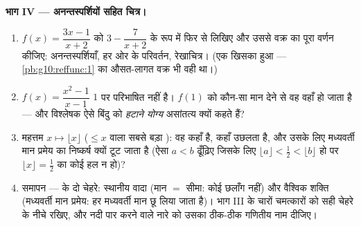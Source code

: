 \begin{problem}
\medskip
\noindent\textbf{भाग IV --- अनन्तस्पर्शियों सहित चित्र।}
\begin{enumerate}[resume]
  \item $f(x) = \dfrac{3x - 1}{x + 2}$ को $3 - \dfrac{7}{x + 2}$ के रूप में फिर से लिखिए और उससे वक्र का पूरा वर्णन
        कीजिए: अनन्तस्पर्शियाँ, हर ओर के परिवर्तन, रेखाचित्र। (एक खिसका हुआ
         --- \cref{pb:g10:reffunc:1} का औसत-लागत वक्र भी वही था।)
  \item {} $f(x) = \dfrac{x^2 - 1}{x - 1}$ $1$ पर परिभाषित नहीं है। $f(1)$ को कौन-सा मान देने से वह
        वहाँ  हो जाता है --- और विश्लेषक ऐसे बिंदु को \emph{हटाने योग्य}
        असांतत्य क्यों कहते हैं?
  \item महत्तम   $x \mapsto \lfloor x \rfloor$ ($\leq x$ वाला सबसे बड़ा ): वह कहाँ
         है, कहाँ उछलता है, और उसके लिए मध्यवर्ती मान प्रमेय का निष्कर्ष
        क्यों टूट जाता है (ऐसा $a < b$ ढूँढ़िए जिसके लिए $\lfloor a \rfloor < \frac12 < \lfloor b \rfloor$ हो पर $\lfloor x \rfloor = \frac12$ का
        कोई हल न हो)?
  \item समापन ---  के दो चेहरे: स्थानीय वादा (मान $=$ सीमा: कोई
        छलाँग नहीं) और वैश्विक शक्ति (मध्यवर्ती मान प्रमेय: हर मध्यवर्ती मान
        छू लिया जाता है)। भाग III के चारों चमत्कारों को सही चेहरे के नीचे
        रखिए, और नदी पार करने वाले नारे को उसका ठीक-ठीक गणितीय नाम दीजिए।
\end{enumerate}
\end{problem}
